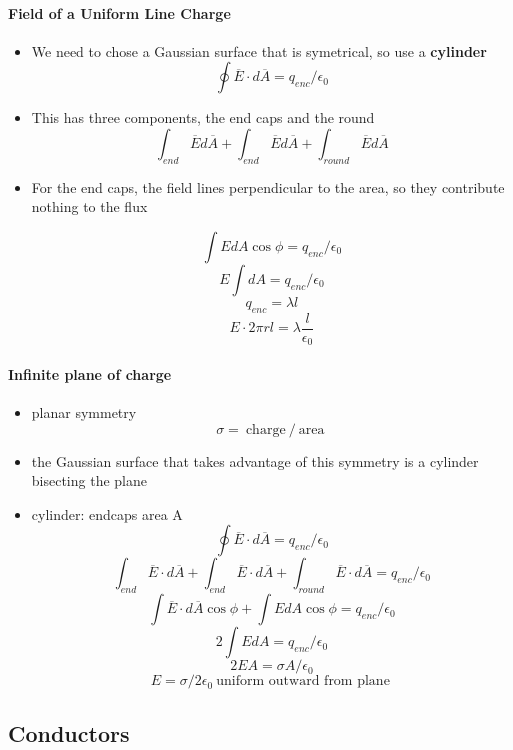 		\paragraph{Field of a Uniform Line Charge}

		\begin{itemize}
		\item We need to chose a Gaussian surface that is symetrical, so use a \textbf{cylinder}
		\[ \oint \overline{E} \cdot d \overline{A} = q_{enc}/\epsilon_0\]
		\item This has three components, the end caps and the round
			\[\int_{end} \overline{E} d \overline{A} +\int_{end} \overline{E} d \overline{A} +\int_{round} \overline{E} d \overline{A} \]
		\item For the end caps, the field lines perpendicular to the area, so they contribute nothing to the flux

			\[\int E dA \cos \phi  = q_{enc}/\epsilon_0\]
			\[E\int  dA = q_{enc}/\epsilon_0\]
			\[q_{enc} = \lambda l\]
			\[E \cdot 2\pi r l = \lambda \frac{l}{\epsilon_0}\]

		\end{itemize}
		\paragraph{Infinite plane of charge}
		\begin{itemize}
			\item planar symmetry
				\[ \sigma = \:\text{charge}\:/\:\text{area}\:\]
				\item the Gaussian surface that takes advantage of this symmetry is a cylinder bisecting the plane
					\item cylinder: endcaps area A
						\[\oint  \overline{E} \cdot d \overline{A} = q_{enc}/\epsilon_0\]
						\[\int_{end}  \overline{E} \cdot d \overline{A}+ \int_{end}  \overline{E} \cdot d \overline{A} + \int_{round}  \overline{E} \cdot d \overline{A} = q_{enc}/\epsilon_0\]
						\[\int  \overline{E} \cdot d \overline{A} \cos \phi   + \int E dA \cos \phi = q_{enc}/\epsilon_0\]
						\[2\int E dA= q_{enc}/\epsilon_0\]
						\[2E A= \sigma A/\epsilon_0\]
						\[E = \sigma / 2\epsilon_0 \:\text{uniform outward from plane}\:\]
		\end{itemize}

		\subsection{Conductors}%
		\label{sub:conductors}

